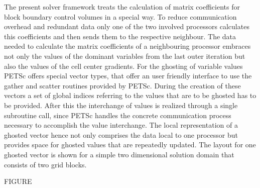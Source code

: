 The present solver framework treats the calculation of matrix coefficients for block boundary control volumes in a special way. To reduce communication overhead and redundant data only one of the two involved processors calculates this coefficients and then sends them to the respective neighbour. The data needed to calculate the matrix coefficients of a neighbouring processor embraces not only the values of the dominant variables from the last outer iteration but also the values of the cell center gradients. For the ghosting of variable values PETSc offers special vector types, that offer an user friendly interface to use the gather and scatter routines provided by PETSc. During the creation of these vectors a set of global indices referring to the values that are to be ghosted has to be provided. After this the interchange of values is realized through a single subroutine call, since PETSc handles the concrete communication process necessary to accomplish the value interchange. The local representation of a ghosted vector hence not only comprises the data local to one processor but provides space for ghosted values that are repeatedly updated. The layout for one ghosted vector is shown for a simple two dimensional solution domain that consists of two grid blocks.

FIGURE
